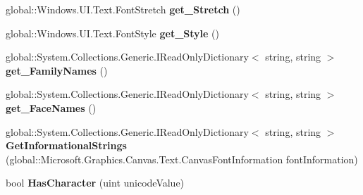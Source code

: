 \begin{DoxyCompactItemize}
\item 
\mbox{\label{interface_microsoft_1_1_graphics_1_1_canvas_1_1_text_1_1_i_canvas_font_face_a9caa5dbc136e73f4f101f68caf4998a9}} 
global\+::\+Windows.\+U\+I.\+Text.\+Font\+Stretch {\bfseries get\+\_\+\+Stretch} ()
\item 
\mbox{\label{interface_microsoft_1_1_graphics_1_1_canvas_1_1_text_1_1_i_canvas_font_face_ade1356d4fa0f617d15664aeed9c5f1a3}} 
global\+::\+Windows.\+U\+I.\+Text.\+Font\+Style {\bfseries get\+\_\+\+Style} ()
\item 
\mbox{\label{interface_microsoft_1_1_graphics_1_1_canvas_1_1_text_1_1_i_canvas_font_face_a73f0fb8007a55fff8060acaf2333c43c}} 
global\+::\+System.\+Collections.\+Generic.\+I\+Read\+Only\+Dictionary$<$ string, string $>$ {\bfseries get\+\_\+\+Family\+Names} ()
\item 
\mbox{\label{interface_microsoft_1_1_graphics_1_1_canvas_1_1_text_1_1_i_canvas_font_face_a48b2ec346abde62b9c208edbedac56c1}} 
global\+::\+System.\+Collections.\+Generic.\+I\+Read\+Only\+Dictionary$<$ string, string $>$ {\bfseries get\+\_\+\+Face\+Names} ()
\item 
\mbox{\label{interface_microsoft_1_1_graphics_1_1_canvas_1_1_text_1_1_i_canvas_font_face_a1a0aad2a6603611b3f19911eb6908380}} 
global\+::\+System.\+Collections.\+Generic.\+I\+Read\+Only\+Dictionary$<$ string, string $>$ {\bfseries Get\+Informational\+Strings} (global\+::\+Microsoft.\+Graphics.\+Canvas.\+Text.\+Canvas\+Font\+Information font\+Information)
\item 
\mbox{\label{interface_microsoft_1_1_graphics_1_1_canvas_1_1_text_1_1_i_canvas_font_face_a5fedc92111007ced9ad11c7f8c3cca05}} 
bool {\bfseries Has\+Character} (uint unicode\+Value)
\item 
\mbox{\label{interface_microsoft_1_1_graphics_1_1_canvas_1_1_text_1_1_i_canvas_font_face_a32cd4710536dd3efe9632f63fb92dec4}} 

\end{DoxyCompactItemize}
